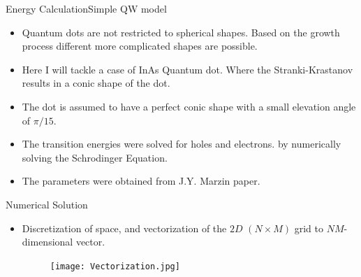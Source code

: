 \documentclass{beamer}
\begin{document}
\begin{frame}{Energy Calculation}{Simple QW model}
    \begin{itemize}
        \item Quantum dots are not restricted to spherical shapes. Based on the growth process different more complicated shapes are possible.
        \item Here I will tackle a case of InAs Quantum dot. Where the Stranki-Krastanov results in a conic shape of the dot.
        \item The dot is assumed to have a perfect conic shape with a small elevation angle of $\pi/15$.
        \item The transition energies were solved for holes and electrons. by numerically solving the Schrodinger Equation.
        \item The parameters were obtained from J.Y. Marzin paper.
    \end{itemize}
\end{frame}

\begin{frame}{Numerical Solution}
    \begin{itemize}
        \item Discretization of space, and vectorization of the $2D$ $(N\times M)$ grid to $NM$-dimensional vector.
        \begin{figure}
            \centering
            \texttt{[image: Vectorization.jpg]}
            \label{fig:discretization}
        \end{figure}
    \end{itemize}
\end{frame}
\end{document}

